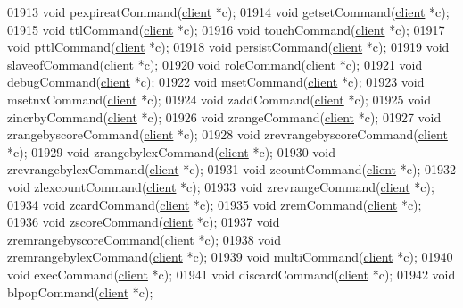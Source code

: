 \begin{DoxyCode}
{{{{{{{01913 \textcolor{keywordtype}{void} pexpireatCommand(\hyperlink{structclient}{client} *c);
01914 \textcolor{keywordtype}{void} getsetCommand(\hyperlink{structclient}{client} *c);
01915 \textcolor{keywordtype}{void} ttlCommand(\hyperlink{structclient}{client} *c);
01916 \textcolor{keywordtype}{void} touchCommand(\hyperlink{structclient}{client} *c);
01917 \textcolor{keywordtype}{void} pttlCommand(\hyperlink{structclient}{client} *c);
01918 \textcolor{keywordtype}{void} persistCommand(\hyperlink{structclient}{client} *c);
01919 \textcolor{keywordtype}{void} slaveofCommand(\hyperlink{structclient}{client} *c);
01920 \textcolor{keywordtype}{void} roleCommand(\hyperlink{structclient}{client} *c);
01921 \textcolor{keywordtype}{void} debugCommand(\hyperlink{structclient}{client} *c);
01922 \textcolor{keywordtype}{void} msetCommand(\hyperlink{structclient}{client} *c);
01923 \textcolor{keywordtype}{void} msetnxCommand(\hyperlink{structclient}{client} *c);
01924 \textcolor{keywordtype}{void} zaddCommand(\hyperlink{structclient}{client} *c);
01925 \textcolor{keywordtype}{void} zincrbyCommand(\hyperlink{structclient}{client} *c);
01926 \textcolor{keywordtype}{void} zrangeCommand(\hyperlink{structclient}{client} *c);
01927 \textcolor{keywordtype}{void} zrangebyscoreCommand(\hyperlink{structclient}{client} *c);
01928 \textcolor{keywordtype}{void} zrevrangebyscoreCommand(\hyperlink{structclient}{client} *c);
01929 \textcolor{keywordtype}{void} zrangebylexCommand(\hyperlink{structclient}{client} *c);
01930 \textcolor{keywordtype}{void} zrevrangebylexCommand(\hyperlink{structclient}{client} *c);
01931 \textcolor{keywordtype}{void} zcountCommand(\hyperlink{structclient}{client} *c);
01932 \textcolor{keywordtype}{void} zlexcountCommand(\hyperlink{structclient}{client} *c);
01933 \textcolor{keywordtype}{void} zrevrangeCommand(\hyperlink{structclient}{client} *c);
01934 \textcolor{keywordtype}{void} zcardCommand(\hyperlink{structclient}{client} *c);
01935 \textcolor{keywordtype}{void} zremCommand(\hyperlink{structclient}{client} *c);
01936 \textcolor{keywordtype}{void} zscoreCommand(\hyperlink{structclient}{client} *c);
01937 \textcolor{keywordtype}{void} zremrangebyscoreCommand(\hyperlink{structclient}{client} *c);
01938 \textcolor{keywordtype}{void} zremrangebylexCommand(\hyperlink{structclient}{client} *c);
01939 \textcolor{keywordtype}{void} multiCommand(\hyperlink{structclient}{client} *c);
01940 \textcolor{keywordtype}{void} execCommand(\hyperlink{structclient}{client} *c);
01941 \textcolor{keywordtype}{void} discardCommand(\hyperlink{structclient}{client} *c);
01942 \textcolor{keywordtype}{void} blpopCommand(\hyperlink{structclient}{client} *c);
}}}}}}}
\end{DoxyCode}
